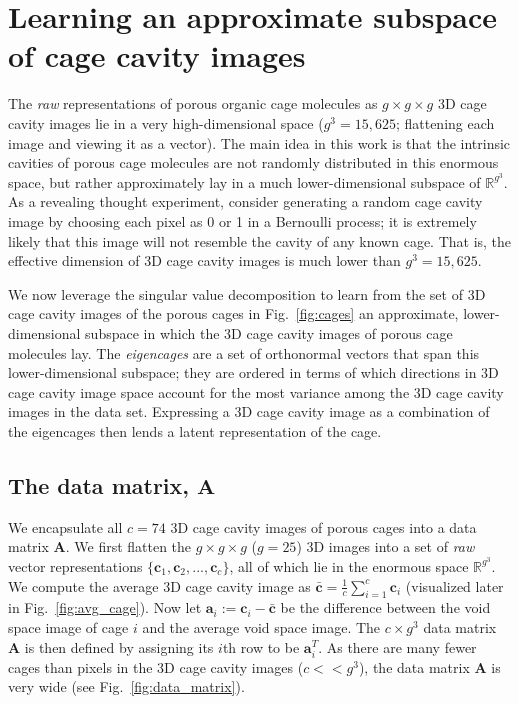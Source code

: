 \documentclass[journal=jacsat,manuscript=article,layout=traditional]{achemso}
\begin{document}
\section{Learning an approximate subspace of cage cavity images} 

The \emph{raw} representations of porous organic cage molecules as $g\times g \times g$ 3D cage cavity images lie in a very high-dimensional space ($g^3=15,625$; flattening each image and viewing it as a vector). The main idea in this work is that the intrinsic cavities of porous cage molecules are not randomly distributed in this enormous space, but rather approximately lay in a much lower-dimensional subspace of $\mathbb{R}^{g^3}$. As a revealing thought experiment, consider generating a random cage cavity image by choosing each pixel as 0 or 1 in a Bernoulli process; it is extremely likely that this image will not resemble the cavity of any known cage. That is, the effective dimension of 3D cage cavity images is much lower than $g^3=15,625$. 

We now leverage the singular value decomposition \cite{muller2004singular,kalman1996singularly,strang1993introduction} to learn from the set of 3D cage cavity images of the porous cages in Fig.~\ref{fig:cages} an approximate, lower-dimensional subspace in which the 3D cage cavity images of porous cage molecules lay.
The \emph{eigencages} are a set of orthonormal vectors that span this lower-dimensional subspace; they are ordered in terms of which directions in 3D cage cavity image space account for the most variance among the 3D cage cavity images in the data set. Expressing a 3D cage cavity image as a combination of the eigencages then lends a latent representation of the cage.

\subsection{The data matrix, $\mathbf{A}$} We encapsulate all $c=74$ 3D cage cavity images of porous cages into a data matrix $\mathbf{A}$. We first flatten the $g\times g\times g$ ($g=25$) 3D images into a set of \emph{raw} vector representations $\{\mathbf{c}_1, \mathbf{c}_2, ..., \mathbf{c}_c\}$, all of which lie in the enormous space $\mathbb{R}^{g^3}$. 
We compute the average 3D cage cavity image as $\bar{\mathbf{c}}=\frac{1}{c}\sum_{i=1}^c  \mathbf{c}_i$ (visualized later in Fig.~\ref{fig:avg_cage}). Now let $\mathbf{a}_i:=\mathbf{c}_i-\bar{\mathbf{c}}$ be the difference between the void space image of cage $i$ and the average void space image. The $c \times g^3$ data matrix $\mathbf{A}$ is then defined by assigning its $i$th row to be $\mathbf{a}_i^T$. As there are many fewer cages than pixels in the 3D cage cavity images ($c<<g^3$), the data matrix $\mathbf{A}$ is very wide (see Fig.~\ref{fig:data_matrix}).
\end{document}
